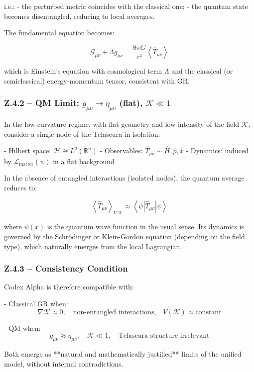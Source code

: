 \documentclass[12pt]{article}
\begin{document}
i.e.:
- the perturbed metric coincides with the classical one;
- the quantum state becomes disentangled, reducing to local averages.

The fundamental equation becomes:

\[
\mathcal{G}_{\mu\nu} + \Lambda g_{\mu\nu} = \frac{8\pi G}{c^4} \left\langle \hat{T}_{\mu\nu} \right\rangle
\]

which is Einstein’s equation with cosmological term $\Lambda$ and the classical (or semiclassical) energy-momentum tensor, consistent with GR.

\subsubsection*{Z.4.2 – QM Limit: $g_{\mu\nu} \to \eta_{\mu\nu}$ (flat), $\mathcal{K} \ll 1$}

In the low-curvature regime, with flat geometry and low intensity of the field $\mathcal{K}$, consider a single node of the Telascura in isolation:

- Hilbert space: $\mathcal{H} \cong L^2(\mathbb{R}^n)$
- Observables: $\hat{T}_{\mu\nu} \sim \hat{H}, \hat{p}, \hat{x}$
- Dynamics: induced by $\mathcal{L}_{\text{matter}}(\psi)$ in a flat background

In the absence of entangled interactions (isolated nodes), the quantum average reduces to:

\[
\left\langle \hat{T}_{\mu\nu} \right\rangle_{\nabla \mathcal{K}} \approx \left\langle \psi \left| \hat{T}_{\mu\nu} \right| \psi \right\rangle
\]

where $\psi(x)$ is the quantum wave function in the usual sense.  
Its dynamics is governed by the Schrödinger or Klein-Gordon equation (depending on the field type), which naturally emerges from the local Lagrangian.

\subsubsection*{Z.4.3 – Consistency Condition}

Codex Alpha is therefore compatible with:

- Classical GR when:
  \[
  \nabla \mathcal{K} \approx 0, \quad \text{non-entangled interactions,} \quad V(\mathcal{K}) \approx \text{constant}
  \]

- QM when:
  \[
  g_{\mu\nu} \approx \eta_{\mu\nu}, \quad \mathcal{K} \ll 1, \quad \text{Telascura structure irrelevant}
  \]

Both emerge as **natural and mathematically justified** limits of the unified model, without internal contradictions.
\end{document}
